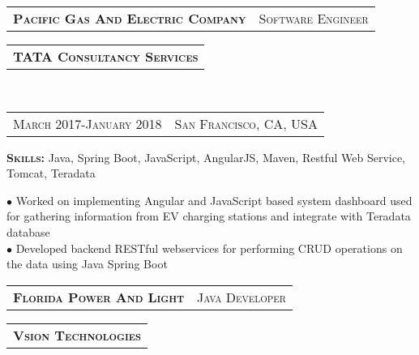\documentclass[10pt,a4paper,oneside]{article}
\begin{document}
\begin{minipage}[t]{0.55\textwidth}
        \begin{tabular}{c|c}
            \textbf{\normalsize P\textsc{acific} G\textsc{as} A\textsc{nd} E\textsc{lectric} C\textsc{ompany}}
            &\textmd{\normalsize S\textsc{oftware} E\textsc{ngineer}}
        \end{tabular}
         \begin{tabular}{c}
            \textbf{\normalsize TATA C\textsc{onsultancy} S\textsc{ervices}}
        \end{tabular}\\
        \textcolor{light-gray}{
            \begin{tabular}{c|c}
                {\small M\textsc{arch 2017}-J\textsc{anuary 2018}}
                &{\small S\textsc{an} F\textsc{rancisco}, C\textsc{A}, U\textsc{SA}}
            \end{tabular}
        }
        \vspace{2mm}
         \begin{adjustwidth}{7pt}{0pt}
            \textbf{S\textsc{kills: }} \small{Java, Spring Boot, JavaScript, AngularJS, Maven, Restful Web Service, Tomcat, Teradata}
        \end{adjustwidth}
        \vspace{1mm}
        \begin{adjustwidth}{7pt}{0pt}
            {\footnotesize $\bullet$ Worked on implementing Angular and JavaScript based system dashboard used for gathering information from EV charging stations and integrate with Teradata database \\
            $\bullet$ Developed backend RESTful webservices for performing CRUD operations on the data using Java Spring Boot}\\
        \end{adjustwidth}    
 	\begin{tabular}{c|c}
           \textbf{\normalsize F\textsc{lorida} P\textsc{ower} A\textsc{nd} L\textsc{ight}}
            &\textmd{\normalsize J\textsc{ava} D\textsc{eveloper}}
        \end{tabular}
        \begin{tabular}{c}
            \textbf{\normalsize V\textsc{sion} T\textsc{echnologies}}
        \end{tabular}\\

\end{minipage}
\end{document}
